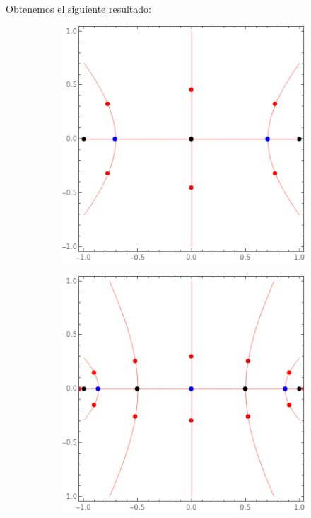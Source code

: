 \begin{solution}
\begin{itemize}
\begin{itemize}
        Obtenemos el siguiente resultado:
        \begin{figure}[h]
            \centering
            \begin{subfigure}{.4\textwidth}
                \centering
                \includegraphics[scale=0.4]{dessins/t2.png}
            \end{subfigure}
            \begin{subfigure}{.4\textwidth}
                \centering
                \includegraphics[scale=0.4]{dessins/t3.png}
            \end{subfigure}
            \begin{subfigure}{.4\textwidth}
                \centering

\end{subfigure}
\end{figure}
\end{itemize}
\end{itemize}
\end{solution}
